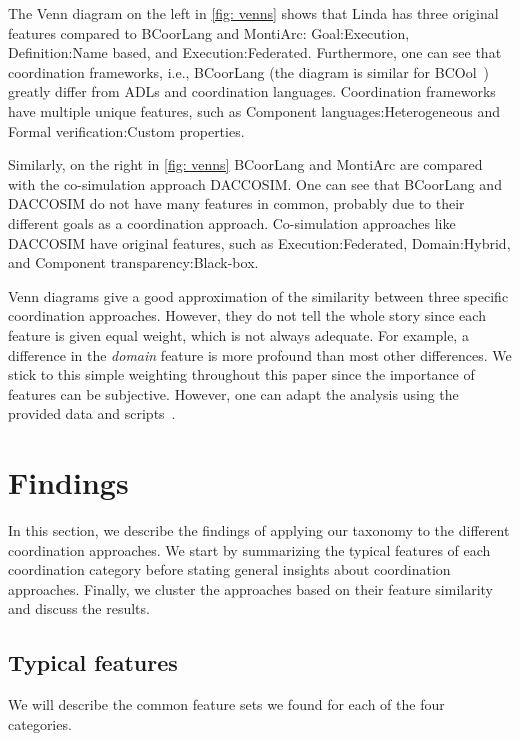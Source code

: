 \documentclass[runningheads]{llncs}
\begin{document}
The Venn diagram on the left in \autoref{fig: venns} shows that Linda has three original features compared to BCoorLang and MontiArc:
\textsf{Goal:Execution}, \textsf{Definition:Name based}, and \textsf{Execution:Federated}.
Furthermore, one can see that coordination frameworks, i.e., BCoorLang (the diagram is similar for BCOol~\cite{varalarsenBehavioralCoordinationOperator2015,varalarsenBCOolBehavioralCoordination2016}) greatly differ from ADLs and coordination languages.
Coordination frameworks have multiple unique features, such as \textsf{Component languages:Heterogeneous} and \textsf{Formal verification:Custom properties}.

Similarly, on the right in \autoref{fig: venns} BCoorLang and MontiArc are compared with the co-simulation approach DACCOSIM.
One can see that BCoorLang and DACCOSIM do not have many features in common, probably due to their different goals as a coordination approach.
Co-simulation approaches like DACCOSIM have original features, such as \textsf{Execution:Federated}, \textsf{Domain:Hybrid}, and \textsf{Component transparency:Black-box}.

Venn diagrams give a good approximation of the similarity between three specific coordination approaches.
However, they do not tell the whole story since each feature is given equal weight, which is not always adequate.
For example, a difference in the \textit{domain} feature is more profound than most other differences.
We stick to this simple weighting throughout this paper since the importance of features can be subjective.
However, one can adapt the analysis using the provided data and scripts~\cite{timkrauterArtifactsCoordination2024}.

\section{Findings} \label{sec: findings}

In this section, we describe the findings of applying our taxonomy to the different coordination approaches.
We start by summarizing the typical features of each coordination category before stating general insights about coordination approaches.
Finally, we cluster the approaches based on their feature similarity and discuss the results.

\subsection{Typical features}
We will describe the common feature sets we found for each of the four categories.
\end{document}
